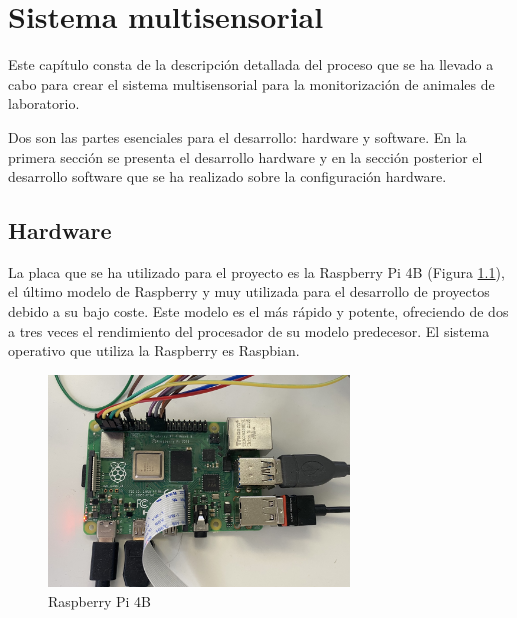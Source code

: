 \chapter{Sistema multisensorial }
\label{cap:capitulo4}



\vspace{1cm}
Este capítulo consta de la descripción detallada del proceso que se ha llevado a cabo para crear el sistema multisensorial para la monitorización de animales de laboratorio. 

Dos son las partes esenciales para el desarrollo: hardware y software. En la primera sección se presenta el desarrollo hardware y en la sección posterior el desarrollo software que se ha realizado sobre la configuración hardware.

\section{Hardware}
La placa que se ha utilizado para el proyecto es la Raspberry Pi 4B (Figura \ref{fig:rasp}), el último modelo de Raspberry y muy utilizada para el desarrollo de proyectos debido a su bajo coste. Este modelo es el más rápido y potente, ofreciendo de dos a tres veces el rendimiento del procesador de su modelo predecesor. El sistema operativo que utiliza la Raspberry es Raspbian.
\begin{figure} [h!]
  \begin{center}
    \includegraphics[width=8cm]{figs/raspberry}
  \end{center}
  \caption{Raspberry Pi 4B}
  \label{fig:rasp}
\end{figure}\\

